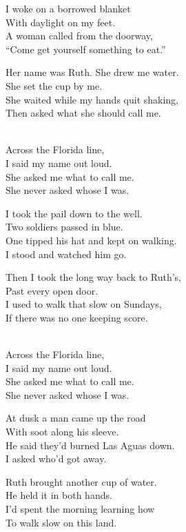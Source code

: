 \begin{lyrics}
I woke on a borrowed blanket\\
With daylight on my feet.\\
A woman called from the doorway,\\
“Come get yourself something to eat.”

Her name was Ruth. She drew me water.\\
She set the cup by me.\\
She waited while my hands quit shaking,\\
Then asked what she should call me.

\\
Across the Florida line,\\
I said my name out loud.\\
She asked me what to call me.\\
She never asked whose I was.

I took the pail down to the well.\\
Two soldiers passed in blue.\\
One tipped his hat and kept on walking.\\
I stood and watched him go.

Then I took the long way back to Ruth’s,\\
Past every open door.\\
I used to walk that slow on Sundays,\\
If there was no one keeping score.

\\
Across the Florida line,\\
I said my name out loud.\\
She asked me what to call me.\\
She never asked whose I was.

At dusk a man came up the road\\
With soot along his sleeve.\\
He said they’d burned Las Aguas down.\\
I asked who’d got away.

Ruth brought another cup of water.\\
He held it in both hands.\\
I’d spent the morning learning how\\
To walk slow on this land.


\end{lyrics}
